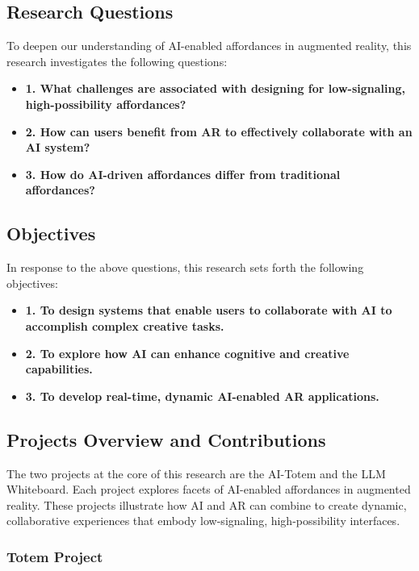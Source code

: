 \subsection{Research Questions}

To deepen our understanding of AI-enabled affordances in augmented reality, this research investigates the following questions:

\begin{itemize}
    \item \textbf{1. What challenges are associated with designing for low-signaling, high-possibility affordances?}
    \item \textbf{2. How can users benefit from AR to effectively collaborate with an AI system?}
    \item \textbf{3. How do AI-driven affordances differ from traditional affordances?}
\end{itemize}

\subsection{Objectives}

In response to the above questions, this research sets forth the following objectives:

\begin{itemize}
    \item \textbf{1. To design systems that enable users to collaborate with AI to accomplish complex creative tasks.}
    \item \textbf{2. To explore how AI can enhance cognitive and creative capabilities.}
    \item \textbf{3. To develop real-time, dynamic AI-enabled AR applications.}
\end{itemize}


\subsection{Projects Overview and Contributions}

The two projects at the core of this research are the AI-Totem and the LLM Whiteboard.
Each project explores facets of AI-enabled affordances in augmented reality.
These projects illustrate how AI and AR can combine to create dynamic, collaborative experiences that embody low-signaling, high-possibility interfaces.

\subsubsection{Totem Project}

